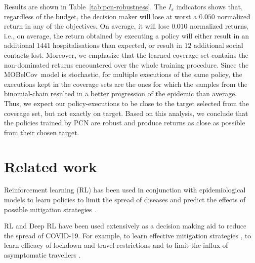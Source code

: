 \documentclass{article}
\renewcommand{\cite}[1]{\citep{#1}}
\newcommand{\momdpname}{MOBelCov}
\begin{document}
Results are shown in Table~\ref{tab:pcn-robustness}. The $I_\varepsilon$ indicators shows that, regardless of the budget, the decision maker will lose at worst a $0.050$ normalized return in any of the objectives. On average, it will lose $0.010$ normalized returns, i.e., on average, the return obtained by executing a policy will either result in an additional $1441$ hospitalisations than expected, or result in $12$ additional social contacts lost. Moreover, we emphasize that the learned coverage set contains the non-dominated returns encountered over the whole training procedure. Since the \momdpname\ model is stochastic, for multiple executions of the same policy, the executions kept in the coverage sets are the ones for which the samples from the binomial-chain resulted in a better progression of the epidemic than average. Thus, we expect our policy-executions to be close to the target selected from the coverage set, but not exactly on target. Based on this analysis, we conclude that the policies trained by PCN are robust and produce returns as close as possible from their chosen target.

\section{Related work}
Reinforcement learning (RL) has been used in conjunction with epidemiological models to learn policies to limit the spread of diseases and predict the effects of possible mitigation strategies \cite{probert2019context,libin2018bayesian,libin2020}.
 
RL and Deep RL have been used extensively as a decision making aid to reduce the spread of COVID-19. For example, to learn effective mitigation strategies \cite{ohi2020exploring}, to learn efficacy of lockdown and travel restrictions \cite{kwak2021covid} and to limit the influx of asymptomatic travellers \cite{bastani2021efficient}.
\end{document}
